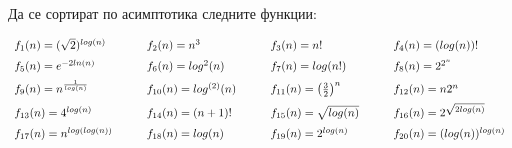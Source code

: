 \begin{problem}
	Да се сортират по асимптотика следните функции:
	\vspace{0.25cm}
	\noindent
	\begin{center}
		$\begin{array}{llll}
			f_1(n)=(\sqrt2)^{log(n)}\qquad  & f_2(n)=n^3\qquad             & f_3(n)=n!\qquad                         & f_4(n)=(log(n))!              \vspace{0.2cm}\\
			f_5(n)=e^{-2ln(n)}\qquad        & f_6(n)=log^2(n)\qquad        & f_7(n)=log(n!)\qquad                    & f_8(n)=2^{2^n}                \vspace{0.2cm}\\
			f_9(n)=n^{\frac1{log(n)}}\qquad & f_{10}(n)=log^{(2)}(n)\qquad & f_{11}(n)=\big(\frac{3}{2}\big)^n\qquad & f_{12}(n)=n2^n                \vspace{0.2cm}\\
			f_{13}(n)=4^{log(n)}\qquad      & f_{14}(n)=(n+1)!\qquad       & f_{15}(n)=\sqrt{log(n)}\qquad           & f_{16}(n)=2^{\sqrt{2log(n)}}  \vspace{0.2cm}\\
			f_{17}(n)=n^{log(log(n))}\qquad & f_{18}(n)=log(n)\qquad       & f_{19}(n)=2^{log(n)}\qquad              & f_{20}(n)=(log(n))^{log(n)}
		\end{array}$
	\end{center}
\end{problem}
\vspace{0.25cm}
